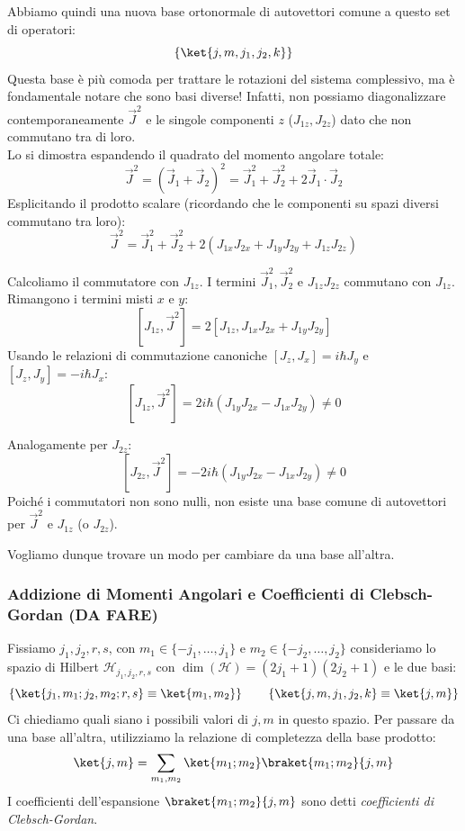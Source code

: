 Abbiamo quindi una nuova base ortonormale di autovettori comune a questo set di operatori:
\[
    \left\{ \ket{j, m, j_1, j_2, k} \right\}
\]
Questa base è più comoda per trattare le rotazioni del sistema complessivo, ma è fondamentale notare che sono basi diverse!
Infatti, non possiamo diagonalizzare contemporaneamente \( \vec{J}^2 \) e le singole componenti \( z \) (\( J_{1z}, J_{2z} \)) dato che non commutano tra di loro. \\
Lo si dimostra espandendo il quadrato del momento angolare totale:
\[
    \vec{J}^2 = (\vec{J}_1 + \vec{J}_2)^2 = \vec{J}_1^2 + \vec{J}_2^2 + 2\vec{J}_1 \cdot \vec{J}_2
\]
Esplicitando il prodotto scalare (ricordando che le componenti su spazi diversi commutano tra loro):
\[
    \vec{J}^2 = \vec{J}_1^2 + \vec{J}_2^2 + 2(J_{1x}J_{2x} + J_{1y}J_{2y} + J_{1z}J_{2z})
\]

Calcoliamo il commutatore con \( J_{1z} \). I termini \( \vec{J}_1^2, \vec{J}_2^2 \) e \( J_{1z}J_{2z} \) commutano con \( J_{1z} \). Rimangono i termini misti \( x \) e \( y \):
\[
    [J_{1z}, \vec{J}^2] = 2 [J_{1z}, J_{1x}J_{2x} + J_{1y}J_{2y}]
\]
Usando le relazioni di commutazione canoniche \( [J_z, J_x] = i\hbar J_y \) e \( [J_z, J_y] = -i\hbar J_x \):
\[
    [J_{1z}, \vec{J}^2] = 2i\hbar (J_{1y}J_{2x} - J_{1x}J_{2y}) \neq 0
\]

Analogamente per \( J_{2z} \):
\[
    [J_{2z}, \vec{J}^2] = -2i\hbar (J_{1y}J_{2x} - J_{1x}J_{2y}) \neq 0
\]
Poiché i commutatori non sono nulli, non esiste una base comune di autovettori per \( \vec{J}^2 \) e \( J_{1z} \) (o \( J_{2z} \)).



Vogliamo dunque trovare un modo per cambiare da una base all'altra.

\subsubsection{Addizione di Momenti Angolari e Coefficienti di Clebsch-Gordan (DA FARE)}

Fissiamo \(j_1, j_2, r, s\), con \(m_1 \in \{-j_1, \dots, j_1\} \) e \( m_2 \in \{-j_2, \dots, j_2\}\) 
consideriamo lo spazio di Hilbert \(\mathcal{H}_{j_1, j_2, r, s} \) con \(\dim(\mathcal{H}) = (2j_1+1)(2j_2+1)\) e le due basi:
\[
    \left\{ \ket{j_1, m_1; j_2, m_2; r, s} \equiv \ket{m_1, m_2}\right\} \qquad\left\{ \ket{j, m, j_1, j_2, k}\equiv \ket{j, m}\right\}
\]
Ci chiediamo quali siano i possibili valori di $j, m$ in questo spazio. Per passare da una base all'altra, utilizziamo la relazione di completezza della base prodotto:
\[
    \ket{j, m} = \sum_{m_1, m_2} \ket{m_1; m_2} \braket{m_1; m_2}{j, m}
\]
I coefficienti dell'espansione $\braket{m_1; m_2}{j, m}$ sono detti \textit{coefficienti di Clebsch-Gordan}.

